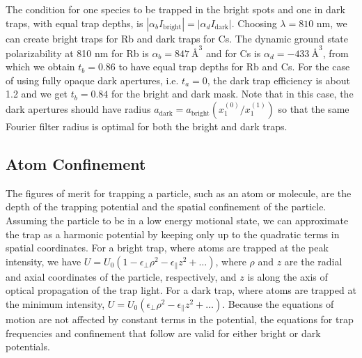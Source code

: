 The condition for one species to be trapped in the bright spots and one in dark traps, with equal trap depths, is  $\left|\alpha_b I_{\text {bright}}\right| = \left|\alpha_d I_{\text {dark}}\right|$. Choosing $\lambda=810$ nm, we can create bright traps for Rb and dark traps for Cs. The dynamic ground state polarizability at 810 nm for Rb is 
$\alpha_b = 847~ \textrm{\AA}^{3}$ and for Cs is $\alpha_d = -433~ \textrm{\AA}^{3}$, from which we obtain $t_b= 0.86$ to have equal trap depths for Rb and Cs. For the case of using fully opaque dark apertures, i.e. $t_a=0$, the dark trap efficiency is about 1.2 and we get $t_b=0.84$ for the bright and dark mask. Note that in this case, the dark apertures should have radius $a_{\textrm{dark}} = a_{\textrm{bright}} (x_1^{(0)}/x_1^{(1)})$ so that the same Fourier filter radius is optimal for both the bright and dark traps.

\subsection{Atom Confinement}\label{sub:confine}

The figures of merit for trapping a particle, such as an atom or molecule, are the depth of the trapping potential and the spatial confinement of the particle. Assuming the particle to be in a low energy motional state, we can approximate the trap as a harmonic potential by keeping only up to the quadratic terms in spatial coordinates. For a bright trap, where atoms are trapped at the peak intensity, we have $U=U_{0}\left(1-\epsilon_{\perp} \rho^{2}-\epsilon_{\|} z^{2}+\ldots\right)$, where $\rho$ and $z$ are the radial and axial coordinates of the particle, respectively, and $z$ is along the axis of optical propagation of the trap light. For a dark trap, where atoms are trapped at the minimum intensity, $U=U_{0}\left(\epsilon_{\perp} \rho^{2}-\epsilon_{\|} z^{2}+\ldots\right)$. Because the equations of motion are not affected by constant terms in the potential, the equations for trap frequencies and confinement that follow are valid for either bright or dark potentials.

